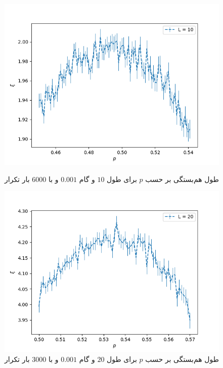 \documentclass[11pt, a4paper]{article}
\begin{document}
\begin{figure}[h]
	\centering
  \begin{minipage}[b]{0.48\textwidth}
    \includegraphics[width=\textwidth]{q5_0.45_0.001_0.54_6000_(10,)}
    \caption{طول هم‌بستگی بر حسب $p$ برای طول $10$ و گام $0.001$ و با $6000$ بار تکرار}
    \label{fig:q5_10}
  \end{minipage}
  \hfill
  \begin{minipage}[b]{0.48\textwidth}
    \includegraphics[width=\textwidth]{q5_0.5_0.001_0.57_3000_(20,)}
    \caption{طول هم‌بستگی بر حسب $p$ برای طول $20$ و گام $0.001$ و با $3000$ بار تکرار}
    \label{fig:q5_20}
  \end{minipage}
  \begin{minipage}[b]{0.48\textwidth}

\end{minipage}
\end{figure}
\end{document}
